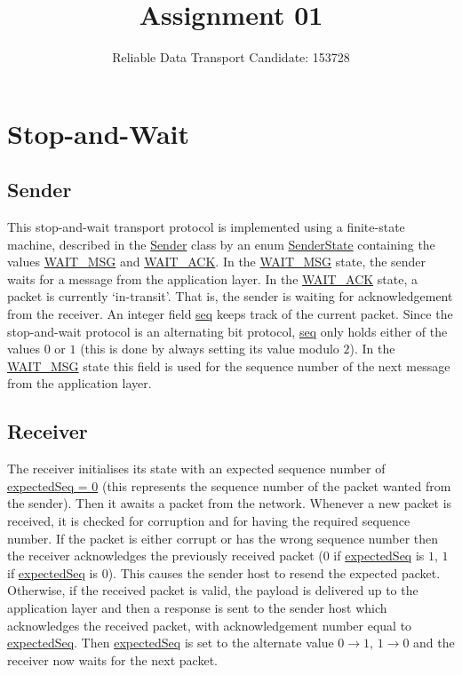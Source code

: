 \documentclass[a4paper]{article}
\title{\vspace{-5ex}Assignment 01}
\author{{Reliable Data Transport \hspace{1cm} Candidate: 153728}}
\date{}
\newcommand{\code}{\url}
\begin{document}
\maketitle
\vspace{-4ex}

\section{Stop-and-Wait}

\subsection{Sender}

This stop-and-wait transport protocol is implemented using a finite-state machine, described in the \code{Sender} class by an enum \code{SenderState} containing the values \code{WAIT_MSG} and \code{WAIT_ACK}. In the \code{WAIT_MSG} state, the sender waits for a message from the application layer. In the \code{WAIT_ACK} state, a packet is currently `in-transit'. That is, the sender is waiting for acknowledgement from the receiver. An integer field \code{seq} keeps track of the current packet. Since the stop-and-wait protocol is an alternating bit protocol, \code{seq} only holds either of the values $0$ or $1$ (this is done by always setting its value modulo $2$). In the \code{WAIT_MSG} state this field is used for the sequence number of the next message from the application layer. 

\subsection{Receiver}

The receiver initialises its state with an expected sequence number of \code{expectedSeq = 0} (this represents the sequence number of the packet wanted from the sender). Then it awaits a packet from the network. Whenever a new packet is received, it is checked for corruption and for having the required sequence number. If the packet is either corrupt or has the wrong sequence number then the receiver acknowledges the previously received packet ($0$ if \code{expectedSeq} is $1$, $1$ if \code{expectedSeq} is $0$). This causes the sender host to resend the expected packet. Otherwise, if the received packet is valid, the payload is delivered up to the application layer and then a response is sent to the sender host which acknowledges the received packet, with acknowledgement number equal to \code{expectedSeq}. Then \code{expectedSeq} is set to the alternate value $0 \rightarrow 1$, $1 \rightarrow 0$ and the receiver now waits for the next packet.
\end{document}
